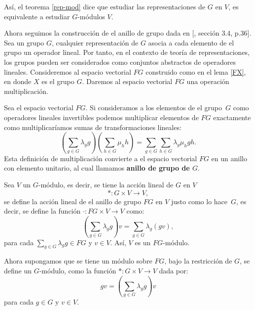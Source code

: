 \documentclass[12pt]{book}
\theoremstyle{definition}
\newtheorem{definition}[theorem]{Definición}
\newcounter{in}
\newcounter{ini}
\begin{document}

Así, el teorema \ref{rep-mod} dice que estudiar las representaciones de $G$
en $V$, es equivalente a estudiar $G$-módulos $V$. 

Ahora seguimos la construcción de el anillo de grupo dada en
[\cite{fulton1991representation}, sección 3.4, p.36]. Sea un grupo $G$, cualquier representación de $G$ asocia a cada
elemento de el grupo un operador lineal. Por tanto, en el contexto de
teoría de representaciones, los grupos pueden ser considerados como
conjuntos abstractos de operadores lineales. Consideremos al espacio
vectorial $FG$ construido como en el lema \ref{FX}, en donde $X$ es el grupo
$G$. Daremos al espacio vectorial $FG$ una operación multiplicación.

Sea el espacio vectorial $FG$. Si consideramos a los elementos de el
grupo~$G$ como operadores lineales invertibles podemos multiplicar
elementos de $FG$ exactamente como multiplicaríamos sumas de
transformaciones lineales:
\begin{equation*}
\label{mult-alg-grupo}
  (\sum_{g\in G}\lambda_{g}g)(\sum_{h\in G}\mu_{h}h)=\sum_{g\in
    G}\sum_{h \in G}\lambda_{g}\mu_{h}gh.
\end{equation*}
Esta definición de multiplicación convierte a el espacio vectorial
$FG$ en un anillo con elemento unitario, al cual llamamos
\textbf{anillo de grupo de $G$}.

Sea $V$ un $G$-módulo, es decir, se tiene la acción lineal de $G$ en $V$ 
$$*:G\times V\rightarrow V,$$ 
se define la acción lineal de el anillo de grupo $FG$ en $V$ justo
como lo hace~$G$, es decir, se define la función $\cdot:FG\times
V\rightarrow V$ como: 
\begin{equation*}
  (\sum_{g\in G}\lambda_{g}g)v=\sum_{g\in G}\lambda_{g}(gv),
\end{equation*}
para cada $\sum_{g\in G}\lambda_{g}g\in FG$ y $v\in V$. Así, $V$ es un
$FG$-módulo.

Ahora supongamos que se tiene un módulo sobre $FG$, bajo la
restricción de $G$, se define un $G$-módulo, como la función
$*:G\times V\rightarrow V$ dada por:
\begin{equation*}
  gv=(\sum_{g\in G}\lambda_{g}g)v
\end{equation*}
para cada $g\in G$ y $v\in V$. %
\end{document}
